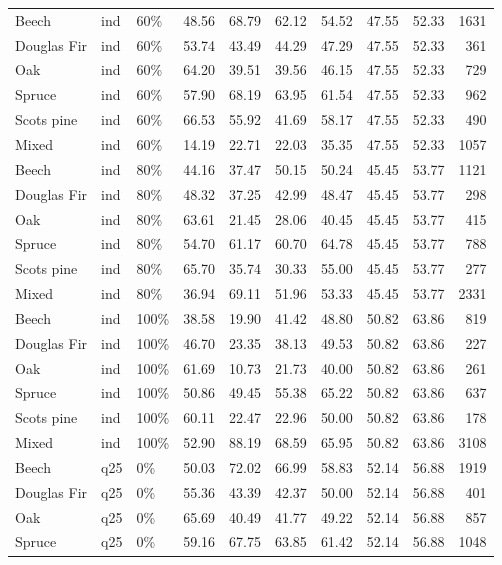 \begin{longtable}{lllrrrrrrr}
  Beech & ind & 60\% & 48.56 & 68.79 & 62.12 & 54.52 & 47.55 & 52.33 & 1631 \\ 
  Douglas Fir & ind & 60\% & 53.74 & 43.49 & 44.29 & 47.29 & 47.55 & 52.33 & 361 \\ 
  Oak & ind & 60\% & 64.20 & 39.51 & 39.56 & 46.15 & 47.55 & 52.33 & 729 \\ 
  Spruce & ind & 60\% & 57.90 & 68.19 & 63.95 & 61.54 & 47.55 & 52.33 & 962 \\ 
  Scots pine & ind & 60\% & 66.53 & 55.92 & 41.69 & 58.17 & 47.55 & 52.33 & 490 \\ 
  Mixed & ind & 60\% & 14.19 & 22.71 & 22.03 & 35.35 & 47.55 & 52.33 & 1057 \\ 
  Beech & ind & 80\% & 44.16 & 37.47 & 50.15 & 50.24 & 45.45 & 53.77 & 1121 \\ 
  Douglas Fir & ind & 80\% & 48.32 & 37.25 & 42.99 & 48.47 & 45.45 & 53.77 & 298 \\ 
  Oak & ind & 80\% & 63.61 & 21.45 & 28.06 & 40.45 & 45.45 & 53.77 & 415 \\ 
  Spruce & ind & 80\% & 54.70 & 61.17 & 60.70 & 64.78 & 45.45 & 53.77 & 788 \\ 
  Scots pine & ind & 80\% & 65.70 & 35.74 & 30.33 & 55.00 & 45.45 & 53.77 & 277 \\ 
  Mixed & ind & 80\% & 36.94 & 69.11 & 51.96 & 53.33 & 45.45 & 53.77 & 2331 \\ 
  Beech & ind & 100\% & 38.58 & 19.90 & 41.42 & 48.80 & 50.82 & 63.86 & 819 \\ 
  Douglas Fir & ind & 100\% & 46.70 & 23.35 & 38.13 & 49.53 & 50.82 & 63.86 & 227 \\ 
  Oak & ind & 100\% & 61.69 & 10.73 & 21.73 & 40.00 & 50.82 & 63.86 & 261 \\ 
  Spruce & ind & 100\% & 50.86 & 49.45 & 55.38 & 65.22 & 50.82 & 63.86 & 637 \\ 
  Scots pine & ind & 100\% & 60.11 & 22.47 & 22.96 & 50.00 & 50.82 & 63.86 & 178 \\ 
  Mixed & ind & 100\% & 52.90 & 88.19 & 68.59 & 65.95 & 50.82 & 63.86 & 3108 \\ 
  Beech & q25 & 0\% & 50.03 & 72.02 & 66.99 & 58.83 & 52.14 & 56.88 & 1919 \\ 
  Douglas Fir & q25 & 0\% & 55.36 & 43.39 & 42.37 & 50.00 & 52.14 & 56.88 & 401 \\ 
  Oak & q25 & 0\% & 65.69 & 40.49 & 41.77 & 49.22 & 52.14 & 56.88 & 857 \\ 
  Spruce & q25 & 0\% & 59.16 & 67.75 & 63.85 & 61.42 & 52.14 & 56.88 & 1048 \\ 

\end{longtable}
